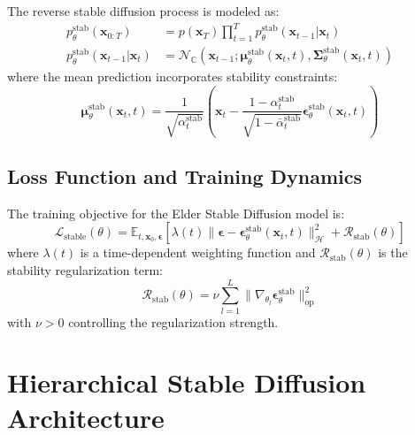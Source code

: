 \begin{definition}
The reverse stable diffusion process is modeled as:
\begin{align}
p_\theta^{\text{stab}}(\mathbf{x}_{0:T}) &= p(\mathbf{x}_T) \prod_{t=1}^T p_\theta^{\text{stab}}(\mathbf{x}_{t-1} | \mathbf{x}_t) \\
p_\theta^{\text{stab}}(\mathbf{x}_{t-1} | \mathbf{x}_t) &= \mathcal{N}_{\mathbb{C}}(\mathbf{x}_{t-1}; \boldsymbol{\mu}_\theta^{\text{stab}}(\mathbf{x}_t, t), \boldsymbol{\Sigma}_\theta^{\text{stab}}(\mathbf{x}_t, t))
\end{align}
where the mean prediction incorporates stability constraints:
\begin{equation}
\boldsymbol{\mu}_\theta^{\text{stab}}(\mathbf{x}_t, t) = \frac{1}{\sqrt{\alpha_t^{\text{stab}}}} \left(\mathbf{x}_t - \frac{1-\alpha_t^{\text{stab}}}{\sqrt{1-\bar{\alpha}_t^{\text{stab}}}} \boldsymbol{\epsilon}_\theta^{\text{stab}}(\mathbf{x}_t, t)\right)
\end{equation}
\end{definition}

\subsection{Loss Function and Training Dynamics}

\begin{definition}
The training objective for the Elder Stable Diffusion model is:
\begin{equation}
\mathcal{L}_{\text{stable}}(\theta) = \mathbb{E}_{t,\mathbf{x}_0,\boldsymbol{\epsilon}} \left[\lambda(t) \|\boldsymbol{\epsilon} - \boldsymbol{\epsilon}_\theta^{\text{stab}}(\mathbf{x}_t, t)\|_{\mathcal{H}}^2 + \mathcal{R}_{\text{stab}}(\theta)\right]
\end{equation}
where $\lambda(t)$ is a time-dependent weighting function and $\mathcal{R}_{\text{stab}}(\theta)$ is the stability regularization term:
\begin{equation}
\mathcal{R}_{\text{stab}}(\theta) = \nu \sum_{l=1}^L \|\nabla_{\theta_l} \boldsymbol{\epsilon}_\theta^{\text{stab}}\|_{\text{op}}^2
\end{equation}
with $\nu > 0$ controlling the regularization strength.
\end{definition}

\section{Hierarchical Stable Diffusion Architecture}

